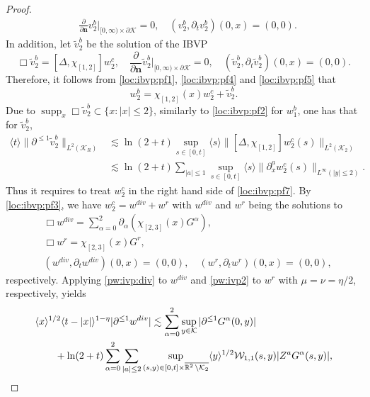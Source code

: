 \documentclass[11pt,twoside]{article}
\def\cK{\mathcal K}
\def\cW{\mathcal W}
\def\R{\mathop{\mathbb R\kern 0pt}\nolimits}
\def\supp{\mathop{\rm supp}\nolimits}
\def\p{\partial}
\def\supp{\operatorname{supp}}
\def\ls{\lesssim}
\def\bn{\mathbf{n}}
\newcommand{\w}[1]{\langle {#1} \rangle}
\theoremstyle{plain}
\theoremstyle{definition}
\numberwithin{equation}{section}
\begin{document}
\begin{proof}
\begin{equation}
\begin{split}
&\frac{\p}{\p\bn}v_2^b|_{[0,\infty)\times\p\cK}=0,\quad (v_2^b,\p_tv_2^b)(0,x)=(0,0).
\end{split}
\end{equation}
In addition, let $\tilde v_2^b$ be the solution of the IBVP
\begin{equation}\label{loc:ibvp:pf5}
\Box\tilde v_2^b=[\Delta,\chi_{[1,2]}]w_2^c,
\quad\frac{\p}{\p\bn}\tilde v_2^b|_{[0,\infty)\times\p\cK}=0,\quad (\tilde v_2^b,\p_t\tilde v_2^b)(0,x)=(0,0).
\end{equation}
Therefore, it follows from \eqref{loc:ibvp:pf1}, \eqref{loc:ibvp:pf4} and \eqref{loc:ibvp:pf5} that
\begin{equation}\label{loc:ibvp:pf6}
w_2^b=\chi_{[1,2]}(x)w_2^c+\tilde v_2^b.
\end{equation}
Due to $\supp_x\Box\tilde v_2^b\subset\{x:|x|\le2\}$, similarly to \eqref{loc:ibvp:pf2} for $w_1^b$, one has that for $\tilde v_2^b$,
\begin{equation}\label{loc:ibvp:pf7}
\begin{split}
\w{t}\|\p^{\le1}\tilde v_2^b\|_{L^2(\cK_R)}
&\ls\ln(2+t)\sup_{s\in[0,t]}\w{s}\|[\Delta,\chi_{[1,2]}]w_2^c(s)\|_{L^2(\cK_2)}\\
&\ls\ln(2+t)\sum_{|a|\le1}\sup_{s\in[0,t]}\w{s}\|\p_x^aw_2^c(s)\|_{L^\infty(|y|\le2)}.
\end{split}
\end{equation}
Thus it requires to treat $w_2^c$ in the right hand side of \eqref{loc:ibvp:pf7}.
By \eqref{loc:ibvp:pf3}, we have $w_2^c=w^{div}+w^r$ with $w^{div}$ and $w^r$ being the solutions to
\begin{equation}\label{loc:ibvp:pf8}
\begin{split}
&\Box w^{div}=\sum_{\alpha=0}^2\p_{\alpha}(\chi_{[2,3]}(x)G^\alpha),\\
&\Box w^r=\chi_{[2,3]}(x)G^r,\\
&(w^{div},\p_tw^{div})(0,x)=(0,0),\quad (w^r,\p_tw^r)(0,x)=(0,0),
\end{split}
\end{equation}
respectively.
Applying \eqref{pw:ivp:div} to $w^{div}$ and \eqref{pw:ivp2} to $w^r$ with $\mu=\nu=\eta/2$, respectively, yields
\begin{equation}\label{loc:ibvp:pf9}
\begin{split}
&\w{x}^{1/2}\w{t-|x|}^{1-\eta}|\p^{\le1}w^{div}|\ls\sum_{\alpha=0}^2\sup_{y\in\cK}|\p^{\le1}G^\alpha(0,y)|\\
&\qquad+\ln(2+t)\sum_{\alpha=0}^2\sum_{|a|\le2}\sup_{(s,y)\in[0,t]\times\overline{\R^2\setminus\cK_2}}\w{y}^{1/2}\cW_{1,1}(s,y)|Z^aG^\alpha(s,y)|,\\

\end{split}
\end{equation}
\end{proof}
\end{document}
